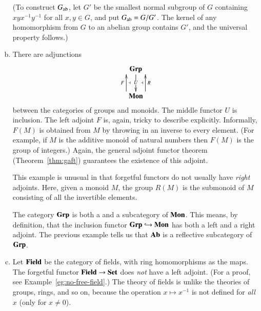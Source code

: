 \begin{examples}
\begin{enumerate}[(b)]
(To construct $G_{\mathrm{ab}}$, let $G'$ be the smallest normal subgroup of $G$
containing $xyx^{-1}y^{-1}$ for all $x, y \in G$, and put $G_{\mathrm{ab}} =
G/G'$.  The kernel of any homomorphism from $G$ to an abelian group
contains $G'$, and the universal property follows.)

\item   
\label{eg:adjns-alg:gp-mon}
There are adjunctions
\[
\xymatrix{
\Grp \ar[d]|{U\vphantom{gl'}}	\\
\Mon \ar@<3ex>[u]^F_\ladj \ar@<-3ex>[u]_R^\ladj
}
%
\index{group!free on monoid}%
\index{monoid!free group on}
\]
between the categories of groups and monoids.  The middle functor $U$ is
inclusion.  The left adjoint $F$ is, again, tricky to describe explicitly.
Informally, $F(M)$ is obtained from $M$ by throwing in an inverse to every
element.  (For example, if $M$ is the additive monoid of natural numbers
then $F(M)$ is the group of integers.)  Again, the general adjoint functor
theorem (Theorem~\ref{thm:gaft}) guarantees the existence of this adjoint.

This example is unusual in that forgetful functors do not usually have
\emph{right} adjoints.  Here, given a monoid $M$, the group $R(M)$ is the
submonoid of $M$ consisting of all the invertible elements.

The category $\mathbf{Grp}$ is both a %
%
%
%
and a %
%
%
subcategory of $\mathbf{Mon}$.  This means, by definition, that the inclusion
functor $\mathbf{Grp} \hookrightarrow \mathbf{Mon}$ has both a left and a right adjoint.  The
previous example tells us that $\mathbf{Ab}$ is a reflective subcategory of $\mathbf{Grp}$.

\item   
\label{egs:adjns-alg:fields}
Let $\mathbf{Field}$%
%
%
be the category of fields,%
%
%
with ring homomorphisms as the maps.  The forgetful functor $\mathbf{Field} \to \mathbf{Set}$
does \emph{not} have a left adjoint.  (For a proof, see
Example~\ref{eg:no-free-field}.)  The theory of fields is unlike the
theories of groups, rings, and so on, because the operation $x \mapsto
x^{-1}$ is not defined for \emph{all} $x$ (only for $x \neq 0$).
%
%
\end{enumerate}
\end{examples}


